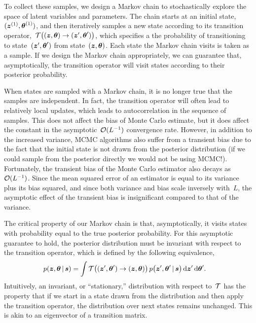 To collect these samples, we design a Markov chain to stochastically
explore the space of latent variables and parameters.  
The chain starts at an initial state,~${(\boldsymbol{z}^{(1)}, \boldsymbol{\theta}^{(1)})}$,
and then iteratively samples a new state according to its transition
operator,~${\mathcal{T} \big((\boldsymbol{z}, \boldsymbol{\theta}) \to (\boldsymbol{z}', \boldsymbol{\theta}') \big)}$, which
specifies a the probability of transitioning to
state~${(\boldsymbol{z}', \boldsymbol{\theta}')}$ from state~${(\boldsymbol{z}, \boldsymbol{\theta})}$.  Each state
the Markov chain visits is taken as a sample. If we design the Markov
chain appropriately, we can guarantee that, asymptotically, the
transition operator will visit states according to their posterior
probability. 

When states are sampled with a Markov chain, it is no longer true that
the samples are independent. In fact, the transition operator will
often lead to relatively local updates, which leads to autocorrelation
in the sequence of samples. This does not affect the bias of Monte
Carlo estimate, but it does affect the constant in the
asymptotic~$\mathcal{O}(L^{-1})$ convergence rate. However, in addition to 
the increased variance, MCMC algorithms also suffer from a transient 
bias due to the fact that the initial state is not drawn from the 
posterior distribution (if we could sample from the posterior directly we would 
not be using MCMC!). Fortunately, the transient bias 
of the Monte Carlo estimator also decays as~$\mathcal{O}(L^{-1})$. Since the 
mean squared error of an estimator is equal to its variance plus its 
 bias squared, and since both variance and bias scale inversely with~$L$, 
the asymptotic effect of the transient bias is insignificant compared to 
that of the variance. 

The critical property of our Markov chain is that, asymptotically, it
visits states with probability equal to the true posterior
probability.  For this asymptotic guarantee to hold, the posterior
distribution must be invariant with respect to the transition
operator, which is defined by the following equivalence,
\begin{align}
  \label{eq:invariance}
  p(\boldsymbol{z}, \boldsymbol{\theta} \,|\, \boldsymbol{s}) 
  &= \int \mathcal{T} \big((\boldsymbol{z}', \boldsymbol{\theta}') \to (\boldsymbol{z}, \boldsymbol{\theta}) \big) \, 
    p \big(\boldsymbol{z}', \boldsymbol{\theta}' \,|\, \boldsymbol{s} \big) \, 
    \mathrm{d}\boldsymbol{z}' \, \mathrm{d}\boldsymbol{\theta}'. 
\end{align}
Intuitively, an invariant, or ``stationary,'' distribution with respect 
to~$\mathcal{T}$ has the property that if we start in a state drawn from the 
distribution and then apply the transition operator, the distribution 
over next states remains unchanged. This is akin to an eigenvector of 
a transition matrix. 

